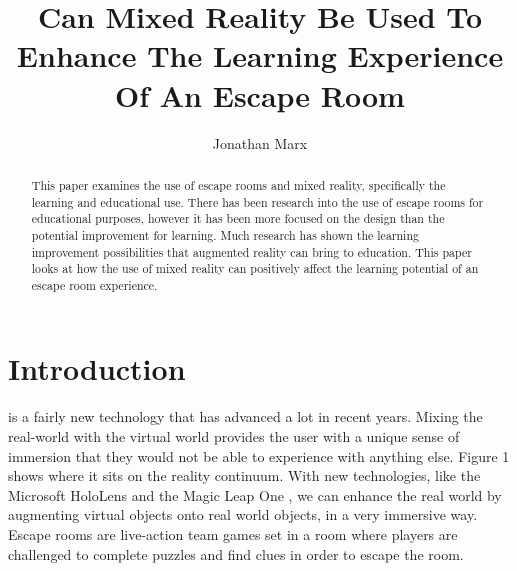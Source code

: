 \documentclass[journal]{IEEEtran}
\begin{document}
%
\title{Can Mixed Reality Be Used To Enhance The Learning Experience Of An Escape Room}
%
%
\author{Jonathan Marx}


\maketitle

\begin{abstract}
This paper examines the use of escape rooms and mixed reality, specifically the learning and educational use. There has been research into the use of escape rooms for educational purposes, however it has been more focused on the design than the potential improvement for learning. Much research has shown the learning improvement possibilities that augmented reality can bring to education. This paper looks at how the use of mixed reality can positively affect the learning potential of an escape room experience.
\end{abstract}

\section{Introduction}
% 
% 
% 
% 
 is a fairly new technology that has advanced a lot in recent years. Mixing the real-world with the virtual world provides the user with a unique sense of immersion that they would not be able to experience with anything else. Figure 1 shows where it sits on the reality continuum. With new technologies, like the Microsoft HoloLens \cite{microsoft_HoloLens} and the Magic Leap One \cite{magic}, we can enhance the real world by augmenting virtual objects onto real world objects, in a very immersive way. Escape rooms are live-action team games set in a room where players are challenged to complete puzzles and find clues in order to escape the room.
\end{document}
